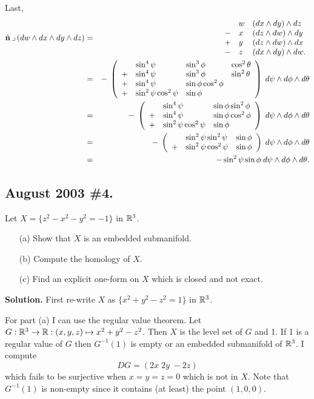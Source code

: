\documentclass[10pt]{article}
\numberwithin{equation}{subsection}
\begin{document}
Last,
\begin{eqnarray*}
	\nhat \ctt (dw \wedge dx \wedge dy \wedge dz)
	&=& \ulmatrix{
		&  w & (dx \wedge dy) \wedge dz \\
		-& x & (dz \wedge dw) \wedge dy \\
		+& y & (dz \wedge dw) \wedge dx \\
		-& z & (dx \wedge dy) \wedge dw.
		} \\
%
	&=& -\;\plmatrix{
		&  \sin^4\psi           &\sin^3\phi          &\cos^2\theta  \\
		+& \sin^4\psi           &\sin^3\phi          &\sin^2\theta  \\
		+& \sin^4\psi           &\sin\phi\cos^2\phi  & \\
		+& \sin^2\psi\cos^2\psi &\sin\phi            &
		} \;d\psi \wedge d\phi \wedge d\theta \\
%
	&=& -\;\plmatrix{
		&  \sin^4\psi           &\sin\phi\sin^2\phi \\
		+& \sin^4\psi           &\sin\phi\cos^2\phi \\
		+& \sin^2\psi\cos^2\psi &\sin\phi
		} \;d\psi \wedge d\phi \wedge d\theta \\
%
	&=& -\;\plmatrix{
		&  \sin^2\psi\sin^2\psi &\sin\phi \\
		+& \sin^2\psi\cos^2\psi &\sin\phi
		} \;d\psi \wedge d\phi \wedge d\theta \\
%
	&=& - \sin^2\psi \sin\phi \;d\psi \wedge d\phi \wedge d\theta.
\end{eqnarray*}

\subsection{August 2003 \#4.}

Let $X=\{z^2-x^2-y^2=-1\}$ in $\mathbb{R}^3$.
\begin{itemize}
\item[(a)]  Show that $X$ is an embedded submanifold.
\item[(b)]  Compute the homology of $X$.
\item[(c)]  Find an explicit one-form on $X$ which is closed and not exact.
\end{itemize}

\textbf{Solution.}  First re-write $X$ as $\{x^2+y^2-z^2=1\}$ in $\mathbb{R}^3$.

For part (a) I can use the regular value theorem.  Let $G:\mathbb{R}^3\to\mathbb{R}: (x,y,z)
\mapsto x^2+y^2-z^2$.  Then $X$ is the level set of $G$ and 1.  If 1 is a
regular value of $G$ then $G^{-1}(1)$ is empty or an embedded submanifold of
$\mathbb{R}^3$.  I compute
$$
	DG = (2x \; 2y \; -2z)
$$
which fails to be surjective when $x=y=z=0$ which is not in $X$.  Note that
$G^{-1}(1)$ is non-empty since it contains (at least) the point $(1,0,0)$.
\end{document}
